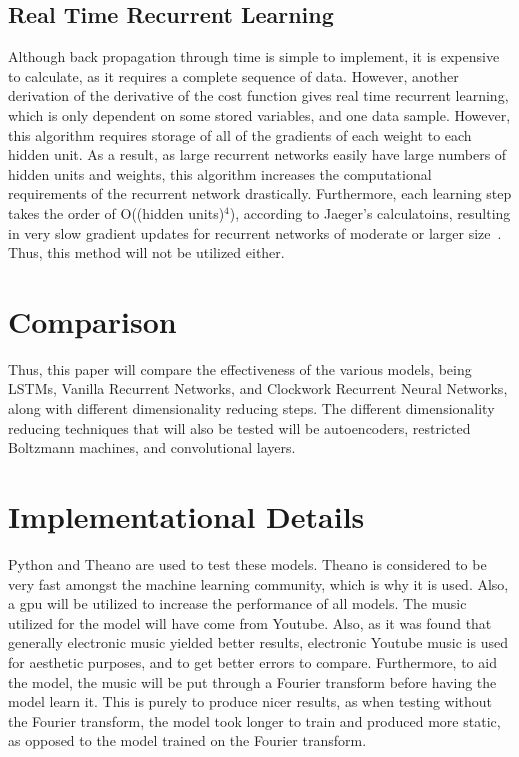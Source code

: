 \documentclass{article}
\begin{document}
\subsection{Real Time Recurrent Learning}
Although back propagation through time is simple to implement, it is expensive
to calculate, as it requires a complete sequence of data. However, another
derivation of the derivative of the cost function gives real time recurrent
learning, which is only dependent on some stored variables, and one data sample.
However, this algorithm requires storage of all of the gradients of each weight
to each hidden unit. As a result, as large recurrent networks easily have large
numbers of hidden units and weights, this algorithm increases the computational
requirements of the recurrent network drastically. Furthermore, each learning
step takes the order of O((hidden units)$^4$), according to Jaeger's calculatoins,
resulting in very slow gradient updates for recurrent networks of moderate or
larger size~\cite{rnntrain}. Thus, this method will not be utilized either.


\section{Comparison}
Thus, this paper will compare the effectiveness of the various models, being
LSTMs, Vanilla Recurrent Networks, and Clockwork Recurrent Neural Networks,
along with different dimensionality reducing steps. The different dimensionality
reducing techniques that will also be tested will be autoencoders, restricted
Boltzmann machines, and convolutional layers.

\section{Implementational Details}
Python and Theano are used to test these models. Theano is considered to be very
fast amongst the machine learning community, which is why it is used. Also, a
gpu will be utilized to increase the performance of all models. The music
utilized for the model will have come from Youtube. Also, as it was found that
generally electronic music yielded better results, electronic Youtube music is
used for aesthetic purposes, and to get better errors to compare. Furthermore,
to aid the model, the music will be put through a Fourier transform before
having the model learn it. This is purely to produce nicer results, as when
testing without the Fourier transform, the model took longer to train and
produced more static, as opposed to the model trained on the Fourier transform.
\end{document}
